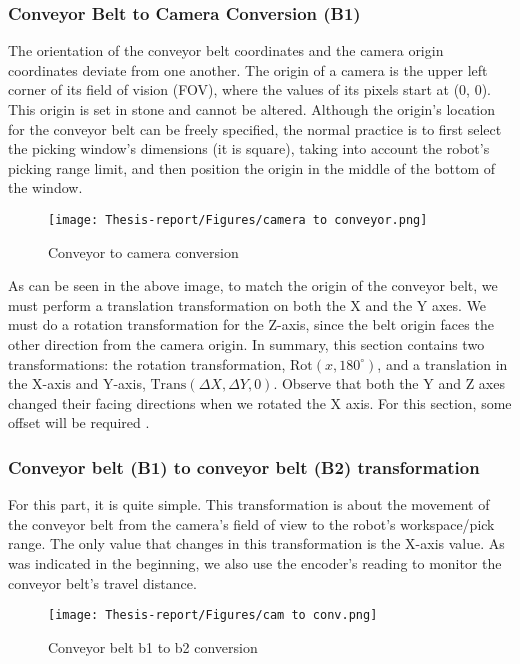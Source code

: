 \documentclass[12pt]{article}
\begin{document}
\subsubsection{Conveyor Belt to Camera Conversion (B1)}
The orientation of the conveyor belt coordinates and the camera origin coordinates deviate from one another. The origin of a camera is the upper left corner of its field of vision (FOV), where the values of its pixels start at (0, 0). This origin is set in stone and cannot be altered. Although the origin's location for the conveyor belt can be freely specified, the normal practice is to first select the picking window's dimensions (it is square), taking into account the robot's picking range limit, and then position the origin in the middle of the bottom of the window\cite{ref25}.\\

\begin{figure}[h]
    \centering
    \texttt{[image: Thesis-report/Figures/camera to conveyor.png]}
    \caption{Conveyor to camera conversion \cite{ref25}}
    \label{fig:conveyor}
\end{figure}
As can be seen in the above image, to match the origin of the conveyor belt, we must perform a translation transformation on both the X and the Y axes. We must do a rotation transformation for the Z-axis, since the belt origin faces the other direction from the camera origin. In summary, this section contains two transformations: the rotation transformation, $\text{Rot}(x, 180^\circ)$, and a translation in the X-axis and Y-axis, $\text{Trans}(\Delta X, \Delta Y, 0)$. Observe that both the Y and Z axes changed their facing directions when we rotated the X axis. For this section, some offset will be required \cite {ref25}.\\

\subsubsection{Conveyor belt (B1) to conveyor belt (B2) transformation}
For this part, it is quite simple. This transformation is about the movement of the conveyor belt from the camera’s field of view to the robot’s workspace/pick range. The only value that changes in this transformation is the X-axis value. As was indicated in the beginning, we also use the encoder's reading to monitor the conveyor belt's travel distance\cite{ref25}.\\

\begin{figure}[h]
    \centering
    \texttt{[image: Thesis-report/Figures/cam to conv.png]}
    \caption{Conveyor belt b1 to b2 conversion \cite{ref25}}
    \label{fig:conv-b12}
\end{figure}
\newpage
\end{document}
